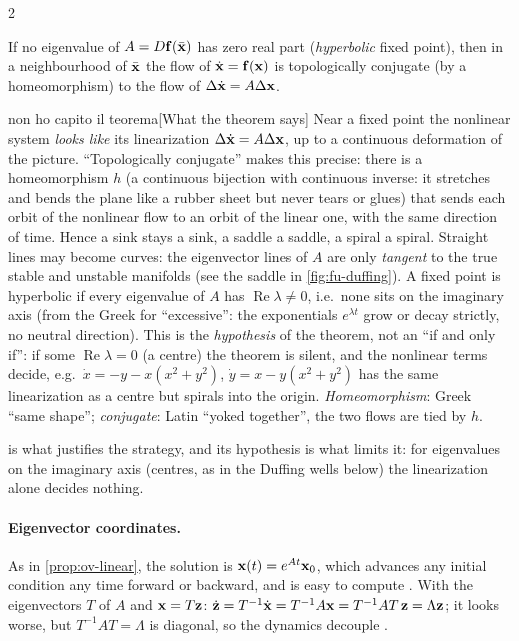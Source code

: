 \begin{paracol}{2}
\begin{theorem}\label{thm:fu-hg}
If no eigenvalue of $A=D\mathbf{f}(\bar{\mathbf{x}})$ has zero real part (\emph{hyperbolic} fixed point), then in
a neighbourhood of $\bar{\mathbf{x}}$ the flow of $\dot{\mathbf{x}}=\mathbf{f}(\mathbf{x})$ is topologically conjugate
(by a homeomorphism) to the flow of $\Delta\dot{\mathbf{x}}=A\Delta\mathbf{x}$.
\end{theorem}
\begin{answer}{non ho capito il teorema}[What the theorem says]
Near a fixed point the nonlinear system \emph{looks like} its linearization $\Delta\dot{\mathbf{x}}=A\Delta\mathbf{x}$,
up to a continuous deformation of the picture. ``Topologically conjugate'' makes this precise: there is a
homeomorphism $h$ (a continuous bijection with continuous inverse: it stretches and bends the plane
like a rubber sheet but never tears or glues) that sends each orbit of the nonlinear flow to an orbit of
the linear one, with the same direction of time. Hence a sink stays a sink, a saddle a saddle, a spiral
a spiral. Straight lines may become curves: the eigenvector lines of $A$ are only \emph{tangent} to the
true stable and unstable manifolds (see the saddle in \cref{fig:fu-duffing}).
A fixed point is hyperbolic if every eigenvalue of $A$ has $\operatorname{Re}\lambda\neq0$, i.e.\ none sits
on the imaginary axis (from the Greek for ``excessive'': the exponentials $e^{\lambda t}$ grow or decay
strictly, no neutral direction). This is the \emph{hypothesis} of the theorem, not an
``if and only if'': if some $\operatorname{Re}\lambda=0$ (a centre) the theorem is silent, and the
nonlinear terms decide, e.g.\ $\dot x=-y-x(x^2+y^2)$, $\dot y=x-y(x^2+y^2)$ has the same linearization as a
centre but spirals into the origin.
\emph{Homeomorphism}: Greek ``same shape''; \emph{conjugate}: Latin ``yoked together'', the two flows are
tied by $h$.
\end{answer}
 is what justifies the strategy, and its hypothesis is what limits it: for eigenvalues
on the imaginary axis (centres, as in the Duffing wells below) the linearization alone decides nothing.

\paragraph{Eigenvector coordinates.} As in \cref{prop:ov-linear}, the solution is
$\mathbf{x}(t)=e^{At}\mathbf{x}_0$, which advances any initial condition any time forward or backward, and is
easy to compute . With the eigenvectors $T$ of $A$ and $\mathbf{x}=T\mathbf{z}$:
$\dot{\mathbf{z}}=T^{-1}\dot{\mathbf{x}}=T^{-1}A\mathbf{x}=T^{-1}AT\,\mathbf{z}=\Lambda\mathbf{z}$; it looks worse, but
$T^{-1}AT=\Lambda$ is diagonal, so the dynamics decouple .


\end{paracol}

